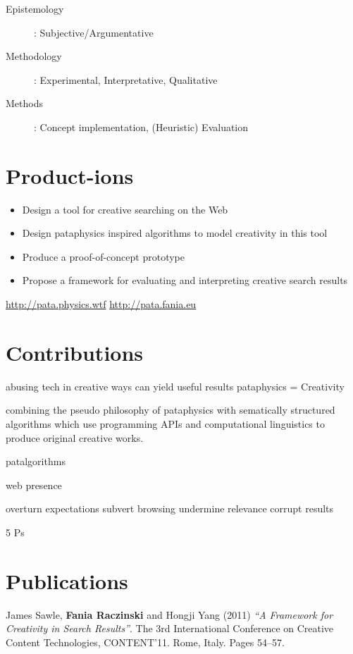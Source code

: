 \begin{description}
  \item [Epistemology]: Subjective/Argumentative
  \item [Methodology]: Experimental, Interpretative, Qualitative
  \item [Methods]: Concept implementation, (Heuristic) Evaluation
\end{description}


\section{Product-ions}

\begin{itemize}
  \item Design a tool for creative searching on the Web
  \item Design pataphysics inspired algorithms to model creativity in this tool
  \item Produce a proof-of-concept prototype
  \item Propose a framework for evaluating and interpreting creative search results
\end{itemize}

\url{http://pata.physics.wtf} \marginpar{!!!}
\url{http://pata.fania.eu} \marginpar{!!!}


\section{Contributions}

abusing tech in creative ways can yield useful results
pataphysics = Creativity

combining the pseudo philosophy of pataphysics with sematically structured algorithms which use programming APIs and computational linguistics to produce original creative works.

patalgorithms

web presence

overturn expectations
subvert browsing
undermine relevance
corrupt results

5 Ps


\section{Publications}

James Sawle, \textbf{Fania Raczinski} and Hongji Yang (2011) \emph{``A Framework for Creativity in Search Results''}. The 3rd International Conference on Creative Content Technologies, CONTENT'11. Rome, Italy. Pages 54--57. \autocite{Sawle2011}

